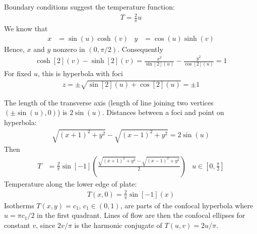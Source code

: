 \documentclass[12pt, english]{book}
\begin{document}
	Boundary conditions suggest the temperature function:
	\begin{align*}
		T = \frac{2}{\pi} u
	\end{align*}
	We know that 
	\begin{align*}
		x &= \sin(u)\cosh(v)	&
		y &= \cos(u)\sinh(v)
	\end{align*}
	Hence, \(x\) and \(y\) nonzero in \((0, \pi/2)\). Consequently
	\begin{align*}
		\cosh[2](v) - \sinh[2](v) = \frac{x^2}{\sin[2](u)} - \frac{y^2}{\cos[2](u)} = 1
	\end{align*}
	For fixed \(u\), this is hyperbola with foci
	\begin{align*}
		z = \pm \sqrt{\sin[2](u) + \cos[2](u)} = \pm 1
	\end{align*}

	The length of the transverse axis (length of line joining two vertices \((\pm \sin(u), 0)\)) is \(2\sin(u)\). Distances between a foci and point on hyperbola:
	\begin{align*}
		\sqrt{(x+1)^2 + y^2} - \sqrt{(x-1)^2 + y^2} = 2\sin(u)
	\end{align*}
	Then
	\begin{align*}
		T &= \frac{2}{\pi} \sin[-1](\frac{\sqrt{(x+1)^2 + y^2} - \sqrt{(x-1)^2 + y^2}}{2})
			& u\in \left[0, \frac{\pi}{2}\right]
	\end{align*}
	Temperature along the lower edge of plate:
	\begin{align*}
		T(x,0) = \frac{2}{\pi} \sin[-1](x)
	\end{align*}
	Isotherms \(T(x,y) = c_1\), \(c_1 \in (0,1)\), are parts of the confocal hyperbola where \(u = \pi c_1 /2\) in the first quadrant. Lines of flow are then the confocal ellipses for constant \(v\), since \(2v/\pi\) is the harmonic conjugate of \(T(u,v) = 2u/\pi\).
	
\end{document}
